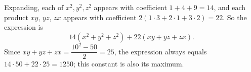Expanding, each of $x^2,y^2,z^2$ appears with coefficient $1+4+9=14$, and each product $xy$, $yz$, $zx$ appears with coefficient $2(1\cdot3+2\cdot1+3\cdot2)=22$. So the expression is
\[
14(x^2+y^2+z^2)+22(xy+yz+zx).
\]
Since $xy+yz+zx=\dfrac{10^2-50}{2}=25$, the expression always equals $14\cdot50+22\cdot25=\boxed{1250}$; this constant is also its maximum.
